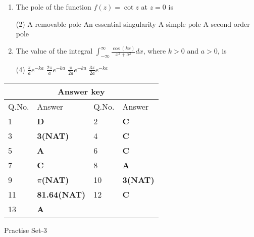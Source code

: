 \begin{enumerate}[label=\color{ocre}\textbf{\arabic*.}]
	{}
	\item The pole of the function $f(z)=\cot z$ at $z=0$ is
	{}
	\begin{tasks}(2)
		\task[\textbf{A.}] A removable pole
		\task[\textbf{B.}] An essential singularity
		\task[\textbf{C.}]  A simple pole
		\task[\textbf{D.}] A second order pole
	\end{tasks}
	\item The value of the integral $\int_{-\infty}^{\infty} \frac{\cos (k x)}{x^{2}+a^{2}} d x$, where $k>0$ and $a>0$, is
	{}
	\begin{tasks}(4)
		\task[\textbf{A.}] $\frac{\pi}{a} e^{-k a}$
		\task[\textbf{B.}] $\frac{2 \pi}{a} e^{-k a}$
		\task[\textbf{C.}] $\frac{\pi}{2 a} e^{-k a}$
		\task[\textbf{D.}] $\frac{3 \pi}{2 a} e^{-k a}$
	\end{tasks}
\end{enumerate}
\setlength\arrayrulewidth{1pt}
\begin{table}[H]
	\centering
	\begin{tabular}{|p{1.5cm}|p{1.7cm}||p{1.5cm}|p{1.5cm}|}
		\hline
		\multicolumn{4}{|c|}{\textbf{Answer key}}\\\hline\hline
		\rowcolor{ocrel}Q.No.&Answer&Q.No.&Answer\\\hline
		1&\textbf{D} &2&\textbf{C}\\\hline 
		3&\textbf{3(NAT)} &4&\textbf{C} \\\hline
		5&\textbf{A} &6&\textbf{C} \\\hline
		7&\textbf{C}&8&\textbf{A}\\\hline
		9&\textbf{$\pi$(NAT)}&10&\textbf{3(NAT)}\\\hline
		11&\textbf{81.64(NAT)} &12&\textbf{C}\\\hline
		13&\textbf{A}& &\textbf{}\\\hline
		
	\end{tabular}
\end{table}
\newpage
\begin{abox}
	Practise Set-3
\end{abox}
